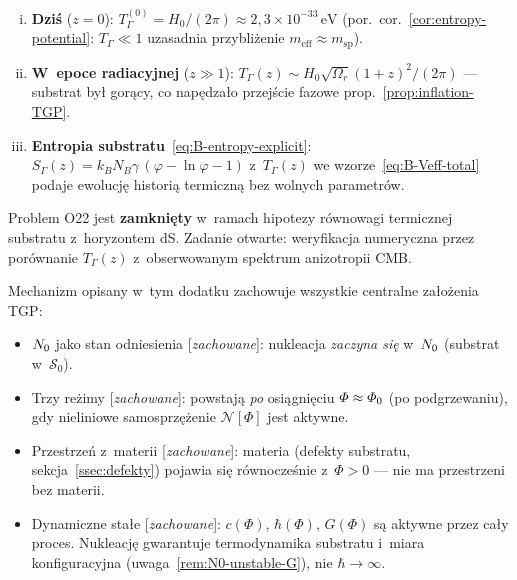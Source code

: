 \begin{corollary}%
\label{cor:O22-II-closed}
\begin{enumerate}[(i)]
  \item \textbf{Dzi\'s} ($z = 0$):
    $T_\Gamma^{(0)} = H_0/(2\pi)
    \approx 2{,}3 \times 10^{-33}\,\mathrm{eV}$
    (por.\ cor.~\ref{cor:entropy-potential}: $T_\Gamma \ll 1$
    uzasadnia przybli\.zenie $m_{\mathrm{eff}} \approx m_{\mathrm{sp}}$).
  \item \textbf{W~epoce radiacyjnej} ($z \gg 1$):
    $T_\Gamma(z) \sim H_0\sqrt{\Omega_r}(1+z)^2/(2\pi)$
    --- substrat by\l{} gor\k{a}cy, co nap\k{e}dza\l{}o przej\'scie fazowe
    prop.~\ref{prop:inflation-TGP}.
  \item \textbf{Entropia substratu}~\eqref{eq:B-entropy-explicit}:
    $S_\Gamma(z) = k_B N_B\gamma\,(\varphi - \ln\varphi - 1)$
    z~$T_\Gamma(z)$ we wzorze~\eqref{eq:B-Veff-total} podaje
    ewolucj\k{e} histori\k{a} termiczn\k{a} bez wolnych parametr\'ow.
\end{enumerate}
Problem O22 jest \textbf{zamkni\k{e}ty} w~ramach hipotezy
r\'ownowagi termicznej substratu z~horyzontem dS.
Zadanie otwarte: weryfikacja numeryczna przez por\'ownanie
$T_\Gamma(z)$ z~obserwowanym spektrum anizotropii CMB.
\end{corollary}

\begin{remark}
Mechanizm opisany w~tym dodatku zachowuje wszystkie
centralne za\l{}o\.zenia TGP:
\begin{itemize}[nosep]
  \item $N_0$ jako stan odniesienia [\emph{zachowane}]:
        nukleacja \emph{zaczyna si\k{e}} w~$N_0$ (substrat w~$\mathcal{S}_0$).
  \item Trzy re\.zimy [\emph{zachowane}]: powstaj\k{a}
        \emph{po} osi\k{a}gni\k{e}ciu $\varPhi \approx \varPhi_0$
        (po podgrzewaniu), gdy nieliniowe samosprz\k{e}\.zenie
        $\mathcal{N}[\Phi]$ jest aktywne.
  \item Przestrze\'n z~materii [\emph{zachowane}]: materia
        (defekty substratu, sekcja~\ref{ssec:defekty})
        pojawia si\k{e} r\'ownocze\'snie z~$\Phi > 0$ ---
        nie ma przestrzeni bez materii.
  \item Dynamiczne sta\l{}e [\emph{zachowane}]: $c(\Phi)$,
        $\hbar(\Phi)$, $G(\Phi)$ s\k{a} aktywne przez ca\l{}y
        proces. Nukleacj\k{e} gwarantuje termodynamika
        substratu i~miara konfiguracyjna
        (uwaga~\ref{rem:N0-unstable-G}), nie $\hbar\to\infty$.
\end{itemize}
\end{remark}
